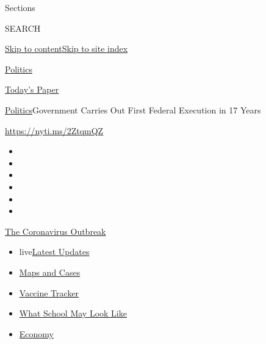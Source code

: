 Sections

SEARCH

\protect\hyperlink{site-content}{Skip to
content}\protect\hyperlink{site-index}{Skip to site index}

\href{https://www.nytimes.com/section/politics}{Politics}

\href{https://myaccount.nytimes.com/auth/login?response_type=cookie\&client_id=vi}{}

\href{https://www.nytimes.com/section/todayspaper}{Today's Paper}

\href{/section/politics}{Politics}\textbar{}Government Carries Out First
Federal Execution in 17 Years

\url{https://nyti.ms/2ZtqmQZ}

\begin{itemize}
\item
\item
\item
\item
\item
\item
\end{itemize}

\href{https://www.nytimes.com/news-event/coronavirus?action=click\&pgtype=Article\&state=default\&region=TOP_BANNER\&context=storylines_menu}{The
Coronavirus Outbreak}

\begin{itemize}
\tightlist
\item
  live\href{https://www.nytimes.com/2020/08/01/world/coronavirus-covid-19.html?action=click\&pgtype=Article\&state=default\&region=TOP_BANNER\&context=storylines_menu}{Latest
  Updates}
\item
  \href{https://www.nytimes.com/interactive/2020/us/coronavirus-us-cases.html?action=click\&pgtype=Article\&state=default\&region=TOP_BANNER\&context=storylines_menu}{Maps
  and Cases}
\item
  \href{https://www.nytimes.com/interactive/2020/science/coronavirus-vaccine-tracker.html?action=click\&pgtype=Article\&state=default\&region=TOP_BANNER\&context=storylines_menu}{Vaccine
  Tracker}
\item
  \href{https://www.nytimes.com/interactive/2020/07/29/us/schools-reopening-coronavirus.html?action=click\&pgtype=Article\&state=default\&region=TOP_BANNER\&context=storylines_menu}{What
  School May Look Like}
\item
  \href{https://www.nytimes.com/live/2020/07/31/business/stock-market-today-coronavirus?action=click\&pgtype=Article\&state=default\&region=TOP_BANNER\&context=storylines_menu}{Economy}
\end{itemize}

